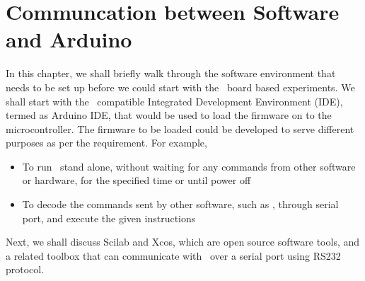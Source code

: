 \chapter{Communcation between Software and Arduino}
\thispagestyle{empty}
\label{sec:sw-env}

\newcommand{\LocSWfig}{\Origin/user-code/sw-env/figures}
\newcommand{\LocSWscicode}{\Origin/user-code/sw-env/scilab}
\newcommand{\LocSWscibrief}[1]{{\texttt
                  Origin/user-code/sw-env/scilab/#1}, see \fnrefp{fn:file-loc}}
\newcommand{\LocSWardcode}{\Origin/user-code/sw-env/arduino}
\newcommand{\LocSWardbrief}[1]{{\tt \seqsplit{
                        Origin/user-code/sw-env/arduino/#1}}, see \fnrefp{fn:file-loc}}

\newcommand{\LocSWchkcode}{\Origin/tools}
\newcommand{\LocSWchkbrief}[1]{{\tt \seqsplit{
                        Origin/tools/#1}}, see \fnrefp{fn:file-loc}}
\newcommand{\LocSWfirmcode}{\Origin/tools/arduino-firmware}
\newcommand{\LocSWfirmbrief}[1]{{\tt \seqsplit{
                        Origin/tools/arduino-firmware/#1}}, see \fnrefp{fn:file-loc}}

\newcommand{\LocFIMpycode}{\Origin/user-code/led/python}  %
\newcommand{\LocFIMpybrief}[1]{{\tt \seqsplit{%
                        Origin/user-code/led/python/#1}}, see \fnrefp{fn:file-loc}} %


\newcommand{\LocFIMjuliacode}{\Origin/user-code/led/julia}  %
\newcommand{\LocFIMjuliabrief}[1]{{\tt \seqsplit{%
                        Origin/user-code/led/julia/#1}}, see \fnrefp{fn:file-loc}} %

\newcommand{\LocFIMOpenModelicacode}{\Origin/user-code/led/OpenModelica}  %
\newcommand{\LocFIMOpenModelicabrief}[1]{{\tt \seqsplit{%
                        Origin/user-code/led/OpenModelica/#1}}, see \fnrefp{fn:file-loc}} %



In this chapter, we shall briefly walk through the software
environment that needs to be set up before we could start with the
\arduino\ board based experiments. We shall start with the \arduino\
compatible Integrated Development Environment (IDE), termed as Arduino
IDE, that would be used to load the firmware on to the
microcontroller. The firmware to be loaded could be developed to serve
different purposes as per the requirement. For example, 
\begin{itemize}
      \item To run \arduino\ stand alone, without waiting for any commands
            from other software or hardware, for the specified time or until
            power off
      \item To decode the commands sent by other software, such as \scilab,
            through serial port, and execute the given instructions
\end{itemize}
Next, we shall discuss Scilab and Xcos, which are open source software
tools, and a related toolbox that can communicate with \arduino\ 
over a serial port using RS232 protocol.

